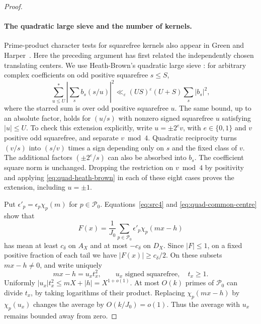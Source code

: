 \begin{proof}
\paragraph{The quadratic large sieve and the number of kernels.}
Prime-product character tests for squarefree kernels also appear in
Green and Harper~\cite[Lemmas~6.1--6.2]{GreenHarper}.
Here the preceding argument has first related the independently chosen
translating centers.
We use Heath-Brown's quadratic large sieve
\cite[Theorem~1]{HeathBrown1995}: for arbitrary complex coefficients
on odd positive squarefree $s\leq S$,
\begin{equation}\label{eq:quad-heath-brown}
 \sum_{u\leq U}^{*}
     \left|\sum_s b_s(s/u)\right|^2
 \ll_\varepsilon (US)^\varepsilon(U+S)\sum_s|b_s|^2,
\end{equation}
where the starred sum is over odd positive squarefree $u$.
The same bound, up to an absolute factor, holds for $(u/s)$ with
nonzero signed squarefree $u$ satisfying $|u|\leq U$.
To check this extension explicitly, write $u=\pm2^e v$, with
$e\in\{0,1\}$ and $v$ positive odd squarefree, and separate
$v\bmod4$.  Quadratic reciprocity turns $(v/s)$ into $(s/v)$ times
a sign depending only on $s$ and the fixed class of $v$.
The additional factors $(\pm2^e/s)$ can also be absorbed into
$b_s$.  The coefficient square norm is unchanged.  Dropping the
restriction on $v\bmod4$ by positivity and applying
\eqref{eq:quad-heath-brown} in each of these eight cases proves the
extension, including $u=\pm1$.

Put $\epsilon'_p=\epsilon_p\chi_p(m)$ for
$p\in\mathcal P_0$.  Equations~\eqref{eq:src4} and
\eqref{eq:quad-common-centre} show that
\[
 F(x)=\frac1{J_0}\sum_{p\in\mathcal P_0}
                          \epsilon'_p\chi_p(mx-h)
\]
has mean at least $c_\delta$ on $A_X$ and at most $-c_\delta$ on
$D_X$.  Since $|F|\leq1$, on a fixed positive fraction of each
tail we have $|F(x)|\geq c_\delta/2$.
On these subsets $mx-h\ne0$, and write uniquely
\[
 mx-h=u_xt_x^2,\qquad u_x\text{ signed squarefree},\quad t_x\geq1.
\]
Uniformly $|u_x|t_x^2\leq mX+|h|=X^{1+o(1)}$.
At most $O(k)$ primes of $\mathcal P_0$ can divide $t_x$, by taking
logarithms of their product.  Replacing $\chi_p(mx-h)$ by
$\chi_p(u_x)$ changes the average by $O(k/J_0)=o(1)$.
Thus the average with $u_x$ remains bounded away from zero.


\end{proof}
